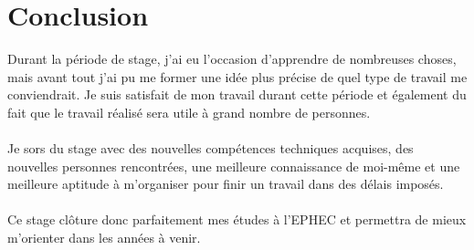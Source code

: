 \documentclass[11pt]{article}
\begin{document}
\newpage

\section{Conclusion}
Durant la période de stage, j'ai eu l'occasion d'apprendre de nombreuses choses, mais avant tout j'ai pu me former une idée plus précise de quel type de travail me conviendrait.
Je suis satisfait de mon travail durant cette période et également du fait que le travail réalisé sera utile à grand nombre de personnes.\\
\\
Je sors du stage avec des nouvelles compétences techniques acquises, des nouvelles personnes rencontrées, une meilleure connaissance de moi-même et une meilleure aptitude à m'organiser pour finir un travail dans des délais imposés.\\
\\
Ce stage clôture donc parfaitement mes études à l'EPHEC et permettra de mieux m'orienter dans les années à venir.
\end{document}
